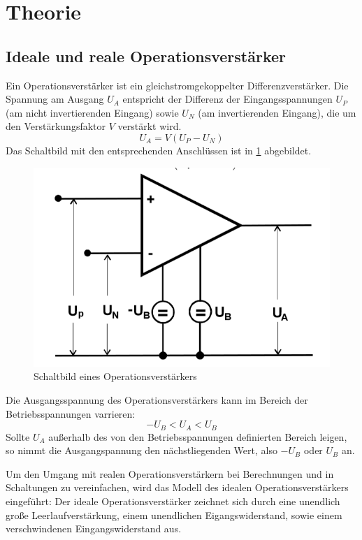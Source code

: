 \section{Theorie}

\subsection{Ideale und reale Operationsverst{\"a}rker}
Ein Operationsverstärker ist ein gleichstromgekoppelter Differenzverstärker. Die Spannung am Ausgang $U_A$ entspricht der Differenz der Eingangsspannungen $U_P$ (am nicht invertierenden Eingang)
sowie $U_N$ (am invertierenden Eingang), die um den Verstärkungsfaktor $V$ verstärkt wird.
\begin{equation}
U_A = V (U_P - U_N)
\end{equation}
Das Schaltbild mit den entsprechenden Anschlüssen ist in \ref{abb:op} abgebildet.
\begin{figure}
 	\centering
 	\includegraphics[width=\textwidth]{img/op.png}
 	\caption{Schaltbild eines Operationsverstärkers \cite{FP}}
 	\label{abb:op}
\end{figure}
Die Ausgangsspannung des Operationsverstärkers kann im Bereich der Betriebsspannungen varrieren:
\begin{equation}
-U_B < U_A < U_B
\end{equation}
Sollte $U_A$ außerhalb des von den Betriebsspannungen definierten Bereich leigen, so nimmt die Ausgangspannung den nächstliegenden Wert, also $-U_B$ oder $U_B$ an.

Um den Umgang mit realen Operationsverstärkern bei Berechnungen und in Schaltungen zu vereinfachen, wird das Modell des idealen Operationsverstärkers eingeführt:
Der ideale Operationsverstärker zeichnet sich durch eine unendlich große Leerlaufverstärkung, einem unendlichen Eigangswiderstand, sowie einem verschwindenen Eingangswiderstand aus.

